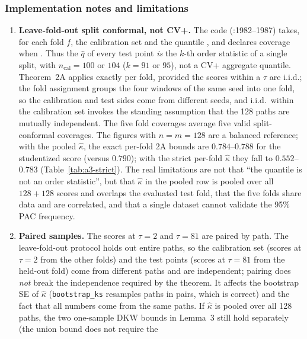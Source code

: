 \subsubsection{Implementation notes and limitations}

\begin{enumerate}
\item \textbf{Leave-fold-out split conformal, not CV+.} The code
   (:1982--1987) takes, for
  each fold $f$, the calibration set  and
  the quantile , and declares coverage
  when . Thus the $\hat q$ of every test
  point \emph{is} the $k$-th order statistic of a single split, with
  $n_{\mathrm{cal}}=100$ or $104$ ($k=91$ or $95$), not a CV+ aggregate quantile.
  Theorem~2A applies exactly per fold, provided the scores within a $\tau$ are
  i.i.d.; the fold assignment groups the four windows of the same seed into one
  fold, so the calibration and test sides come from different seeds, and i.i.d.\
  within the calibration set invokes the standing assumption that the 128 paths
  are mutually independent. The five fold coverages average five valid
  split-conformal coverages. The figures with $n=m=128$ are a balanced reference;
  with the pooled $\hat\kappa$, the exact per-fold 2A bounds are $0.784$--$0.788$
  for the studentized score (versus $0.790$); with the strict per-fold
  $\hat\kappa$ they fall to $0.552$--$0.783$ (Table~\ref{tab:a3-strict}). The real
  limitations are not that ``the quantile is not an order statistic'', but that
  $\hat\kappa$ in the pooled row is pooled over all $128+128$ scores and overlaps
  the evaluated test fold, that the five folds share data and are correlated, and
  that a single dataset cannot validate the 95\% PAC frequency.
\item \textbf{Paired samples.} The scores at $\tau=2$ and $\tau=81$ are paired by
  path. The leave-fold-out protocol holds out entire paths, so the calibration set
  (scores at $\tau=2$ from the other folds) and the test points (scores at
  $\tau=81$ from the held-out fold) come from different paths and are independent;
  pairing does \emph{not} break the independence required by the theorem. It
  affects the bootstrap SE of $\hat\kappa$ (\texttt{bootstrap\_ks} resamples paths
  in pairs, which is correct) and the fact that all numbers come from the same
  paths. If $\hat\kappa$ is pooled over all 128 paths, the two one-sample DKW
  bounds in Lemma~3 still hold separately (the union bound does not require the

\end{enumerate}
